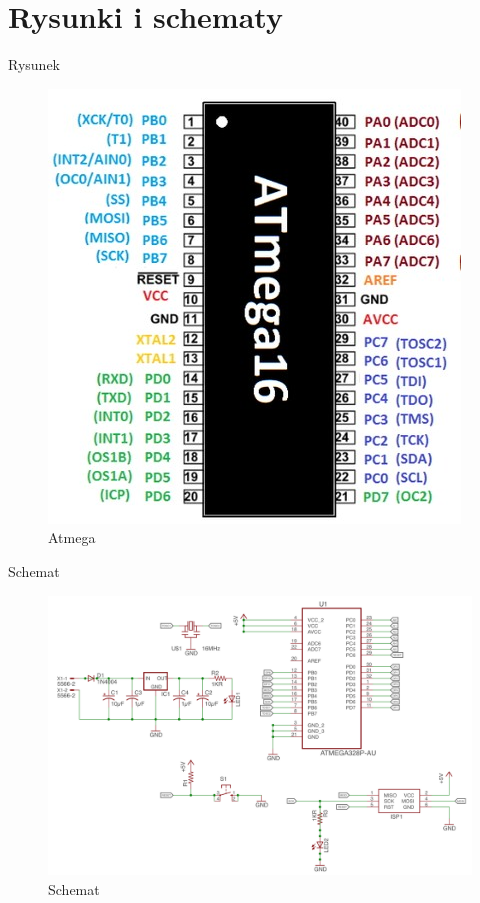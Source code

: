 \documentclass[12pt,a4paper]{report}
\begin{document}
\chapter{Rysunki i schematy}
Rysunek \\[1cm]
\begin{figure}[h]
    \centering
    \includegraphics[scale=2]{atmega16.jpg}
    \caption{Atmega}
    \label{fig:my_label}
\end{figure}
Schemat \\[1cm]
\begin{figure}[h]
    \centering
    \includegraphics[scale=0.3]{atmega_schemat.png}
    \caption{Schemat}
    \label{fig:my_label}
\end{figure}
\newpage
\end{document}

